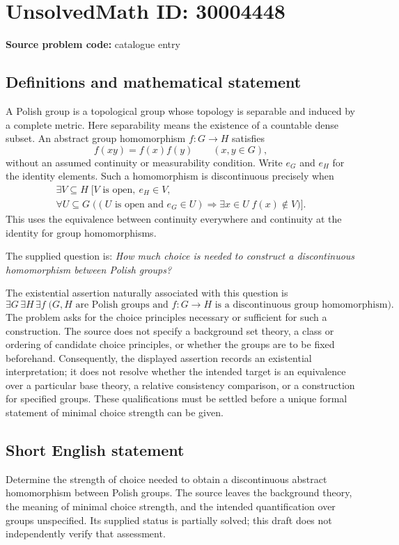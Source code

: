 \documentclass[11pt]{article}
\begin{document}
\section*{UnsolvedMath ID: 30004448}
\textbf{Source problem code:} catalogue entry
\subsection{Definitions and mathematical statement}
A Polish group is a topological group whose topology is separable and induced by a complete metric. Here separability means the existence of a countable dense subset. An abstract group homomorphism \(f:G\to H\) satisfies
\[
 f(xy)=f(x)f(y)\qquad(x,y\in G),
\]
without an assumed continuity or measurability condition. Write \(e_G\) and \(e_H\) for the identity elements. Such a homomorphism is discontinuous precisely when
\[
\begin{gathered}
\exists V\subseteq H\;\bigl[V\text{ is open},\ e_H\in V,\\
\forall U\subseteq G\;\bigl((U\text{ is open and }e_G\in U)
\Longrightarrow \exists x\in U\; f(x)\notin V\bigr)\bigr].
\end{gathered}
\]
This uses the equivalence between continuity everywhere and continuity at the identity for group homomorphisms.

The supplied question is: \emph{How much choice is needed to construct a discontinuous homomorphism between Polish groups?}

The existential assertion naturally associated with this question is
\[
\exists G\,\exists H\,\exists f\;
\bigl(G,H\text{ are Polish groups and }f:G\to H
\text{ is a discontinuous group homomorphism}\bigr).
\]
The problem asks for the choice principles necessary or sufficient for such a construction. The source does not specify a background set theory, a class or ordering of candidate choice principles, or whether the groups are to be fixed beforehand. Consequently, the displayed assertion records an existential interpretation; it does not resolve whether the intended target is an equivalence over a particular base theory, a relative consistency comparison, or a construction for specified groups. These qualifications must be settled before a unique formal statement of minimal choice strength can be given.
\subsection{Short English statement}
Determine the strength of choice needed to obtain a discontinuous abstract homomorphism between Polish groups. The source leaves the background theory, the meaning of minimal choice strength, and the intended quantification over groups unspecified. Its supplied status is partially solved; this draft does not independently verify that assessment.
\end{document}

